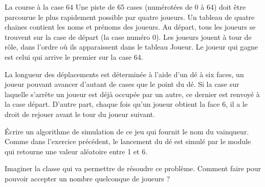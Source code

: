 \begin{Exercice}{La course à la case 64}
	Une piste de 65 cases (numérotées de 0 à 64)
	doit être parcourue le plus rapidement possible par quatre joueurs. Un
	tableau  de quatre chaines contient les noms et prénoms des
	joueurs. Au départ, tous les joueurs se trouvent sur la case de départ
	(la case numéro 0). Les joueurs jouent à tour de rôle, dans l’ordre où
	ils apparaissent dans le tableau Joueur. Le joueur qui gagne est celui
	qui arrive le premier sur la case 64.

	La longueur des déplacements est déterminée à
	l’aide d’un dé à six faces, un joueur pouvant avancer d’autant de cases
	que le point du dé. Si la case sur laquelle s’arrête un joueur est déjà
	occupée par un autre, ce dernier est renvoyé à la case départ. D’autre
	part, chaque fois qu’un joueur obtient la face 6, il a le droit de
	rejouer avant le tour du joueur suivant. 

	Écrire un algorithme de simulation de ce jeu
	qui fournit le nom du vainqueur. Comme dans l’exercice précédent, le
	lancement du dé est simulé par le module  qui retourne une valeur aléatoire entre 1 et 6.

	Imaginer la classe  qui va permettre
	de résoudre ce problème. Comment faire pour pouvoir accepter un nombre
	quelconque de joueurs ?
\end{Exercice}

